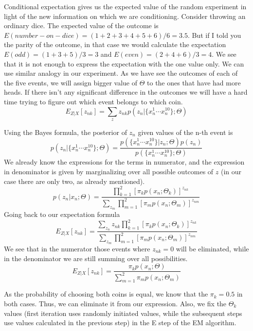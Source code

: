 \documentclass[11pt]{article}
\begin{document}
Conditional expectation gives us the expected value of the random experiment in light of the
new information on which we are conditioning. Consider throwing an ordinary dice. The expected value of the outcome is $E(number-on-dice)=(1+2+3+4+5+6)/6=3.5$. But if I told you the parity of the outcome, in that case we would calculate the expectation $E(odd)=(1+3+5)/3=3$ and $E(even)=(2+4+6)/3=4$. We see that it is not enough to express the expectation with the one value only. We can use similar analogy in our experiment. As we have see the outcomes of each of the five events, we will assign bigger value of $\Theta$ to the ones that have had more heads. If there isn't any significant difference in the outcomes we will have a hard time trying to figure out which event belongs to which coin.
\begin{equation}
  E_{Z|X}[z_{nk}]=
\sum_{z}z_{nk}p(z_n|\{x^1_n\cdots x^{10}_n\};\Theta)  
\end{equation}

Using the Bayes formula, the posterior of $z_n$ given values of the n-th event is
\begin{equation}
p(z_n|\{x^1_n\cdots x^{10}_n\};\Theta)=\frac{p(\{x^1_n\cdots x^{10}_n\}|z_n;\Theta)p(z_n)}{p(\{x^1_n\cdots x^{10}_n\};\Theta)}
\end{equation}
We already know the expressions for the terms in numerator, and the expression in denominator is given by marginalizing over all possible outcomes of $z$ (in our case there are only two, as already mentioned). 
\begin{equation}
p(z_n|x_n;\Theta)=\frac{\prod_{k=1}^{2}[\pi_{k}p(x_n;\Theta_k)]^{z_{nk}}}{\sum_{z_m}\prod_{m=1}^{2}[\pi_{m}p(x_n;\Theta_m)]^{z_{nm}}}
\end{equation}
Going back to our expectation formula
\begin{equation}
E_{Z|X}[z_{nk}]=
\frac{\sum_{z_n}z_{nk}\prod_{k=1}^{2}[\pi_{k}p(x_n;\Theta_k)]^{z_{nk}}}{\sum_{z_m}\prod_{m=1}^{2}[\pi_{m}p(x_n;\Theta_m)]^{z_{nm}}}
\end{equation}
We see that in the numerator those events where $z_{nk}=0$ will be eliminated, while in the denominator we are still summing over all possibilities. 
\begin{equation}
E_{Z|X}[z_{nk}]=
\frac{\pi_{k}p(x_n;\Theta)}{\sum_{m=1}^{2}\pi_{m}p(x_n;\Theta_m)}
\end{equation}

As the probability of choosing both coins is equal, we know that the $\pi_k=0.5$ in both cases. Thus, we can eliminate it from our expression. Also, we fix the $\Theta_k$ values (first iteration uses randomly initiated values, while the subsequent steps use values calculated in the previous step) in the E step of the EM algorithm. 
\end{document}
